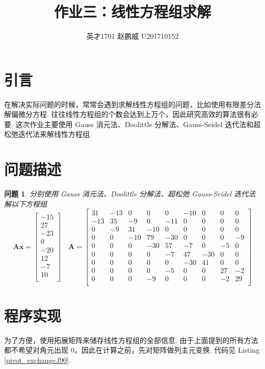 \documentclass{article}
\title{作业三：线性方程组求解}
\author{英才1701 赵鹏威 U201710152}
\newtheorem{task}{问题}
\begin{document}
	\maketitle
	\tableofcontents
	\newpage
	\section{引言}
	在解决实际问题的时候，常常会遇到求解线性方程组的问题，比如使用有限差分法解偏微分方程. 往往线性方程组的个数会达到上万个，因此研究高效的算法很有必要. 这次作业主要使用 Gauss 消元法、Doolittle 分解法、Gauss-Seidel 迭代法和超松弛迭代法来解线性方程组.
	
	\section{问题描述}
	\begin{task}
		分别使用 Gauss 消元法、Doolittle 分解法、超松弛 Gauss-Seidel 迭代法解以下方程组
		\[
		\bm{A}\bm{x}=
		\begin{bmatrix}
		-15 \\
		27 \\
		-23 \\
		0 \\
		-20 \\
		12 \\
		-7 \\
		10 \\
		\end{bmatrix}
		\quad
		\bm{A}=
		\begin{bmatrix}
			 31 & -13 &  0 &  0 &  0 & -10 &  0 &  0 &  0 \\
			-13 &  35 & -9 &  0 & -11 & 0 & 0 & 0 & 0 \\
			0 & -9 & 31 & -10 & 0 & 0 & 0 & 0 & 0  \\
			0 & 0 & -10 & 79 & -30 & 0 & 0 & 0 & -9  \\
			0  &0 & 0 & -30 & 57 & -7 & 0 & -5  &0 \\
			0 & 0  &0  &0 & -7 & 47 & -30 & 0  &0 \\
			0  &0  &0 & 0 & 0  &-30  &41 & 0 & 0 \\
			0& 0& 0& 0 &-5& 0& 0& 27& -2 \\
			0& 0& 0 &-9 &0& 0& 0& -2& 29 \\
		\end{bmatrix}
		\]
	\end{task}
	
	\section{程序实现}
	为了方便，使用拓展矩阵来储存线性方程组的全部信息. 由于上面提到的所有方法都不希望对角元出现 0，因此在计算之前，先对矩阵做列主元变换. 代码见 Listing \ref{pivot_exchange.f90}.
	
	
\end{document}
